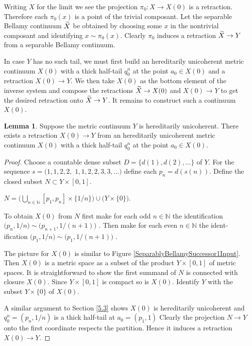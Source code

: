 \documentclass[12pt]{article}
\theoremstyle{plain}
\theoremstyle{definition}
\newtheorem{lemma}[theorem]{Lemma}
\newcommand{\NN}{\ensuremath{\mathbb N}}
\newcommand{\0}{\ensuremath{\varnothing}}
\newcommand{\wt}{\ensuremath{\widetilde}}
\begin{document}
	Writing $X$ for the limit we see the projection $\pi_0: X \to X(0)$ is a retraction. 
	Therefore each $\pi_0(x)$ is a point of the trivial composant. Let the separable Bellamy continuum $\wt X$ be obtained by choosing some $x$ in the nontrivial composant and identifying $x \sim \pi_0(x)$.
	Clearly $\pi_0$ induces a retraction $\wt X \to Y$ from a separable Bellamy continuum.
	
	In case $Y$ has no such tail, we must first build an hereditarily unicoherent metric continuum $X(0)$ with a thick half-tail $q^n_0$ at the point \mbox{$a_0 \in X(0)$} and a retraction $X(0) \to Y$. We then take $X(0)$ as the bottom element of the inverse system and compose the retractions $\wt X \to X(0)$ and $X(0) \to Y$ to get the desired retraction onto $\wt X \to Y$.
	It remains to construct such a continuum $X(0)$.
	
	\begin{lemma}\label{X0retract}
		Suppose the metric continuum $Y$ is hereditarily unicoherent.
		There exists a retraction $X(0) \to Y$ from an hereditarily unicoherent metric continuum $X(0)$ 
		with a thick half-tail $q^n_0$ at the point $a_0 \in X(0)$.
	\end{lemma}
	
	\begin{proof}
		Choose a countable dense subset $D = \{d(1),d(2), \ldots\}$ of $Y$.
		For the sequence $s = (1,1,2,2,$ $1,1, 2,2,3,3, \ldots)$ define each $p_n = d(s(n))$.
		Define the closed subset $N \subset Y \times [0,1]$.
		
		\begin{center}
			$\displaystyle N =  \Big( \bigcup_{n \in \NN}  [p_1,p_n] \times \{1/n\}  \Big ) \cup \big ( Y \times \{0\} \big )$.
		\end{center}
		
		To obtain $X(0)$ from $N$ first make for each odd $n \in \NN$ the identification $\big (p_n, 1/n \big ) \sim  \big (p_{n+1}, 1/(n+1) \big )$ .
		Then make for each even $n \in \NN$ the ident- ification $\big (p_1, 1/n \big ) \sim  \big (p_1, 1/(n+1) \big )$ .
		
		The picture for $X(0)$ is similar to Figure \ref{SeparablyBellamySuccessor1Input}.
		Then $X(0)$ is a metric space as a subset of the product $Y \times [0,1]$ of metric spaces. It is straightforward to show the first summand of $N$ is connected with closure $X(0)$. Since $Y \times [0,1]$ is compact so is $X(0)$. Identify $Y$ with the subset $Y \times \{0\}$ of $X(0)$.
		
		A similar argument to Section \ref{5.3} shows $X(0)$ is hereditarily unicoherent and $q^n_0 = (p_n,1/n)$ is a thick half-tail at $a_0 = (p_1,1)$
		Clearly the projection \mbox{$N \to Y$} onto the first coordinate respects the partition.
		Hence it induces a retraction $X(0) \to Y$.
	\end{proof}
	
\end{document}
